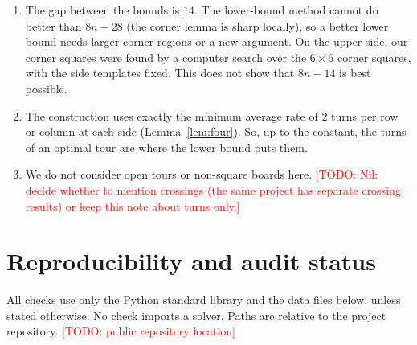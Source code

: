 \documentclass[11pt]{article}
\theoremstyle{definition}
\theoremstyle{remark}
\newcommand{\todo}[1]{\textcolor{red}{[TODO: #1]}}
\begin{document}
\begin{enumerate}
\item The gap between the bounds is $14$.
The lower-bound method cannot do better than $8n-28$ (the corner lemma is sharp locally), so a better lower bound needs larger corner regions or a new argument.
On the upper side, our corner squares were found by a computer search over the $6\times6$ corner squares, with the side templates fixed. This does not show that $8n-14$ is best possible.
\item The construction uses exactly the minimum average rate of $2$ turns per row or column at each side (Lemma~\ref{lem:four}).
So, up to the constant, the turns of an optimal tour are where the lower bound puts them.
\item We do not consider open tours or non-square boards here.
\todo{Nil: decide whether to mention crossings (the same project has separate crossing results) or keep this note about turns only.}
\end{enumerate}

\appendix

\section{Reproducibility and audit status}\label{app:repro}

All checks use only the Python standard library and the data files below, unless stated otherwise.
No check imports a solver.
Paths are relative to the project repository. \todo{public repository location}
\end{document}
